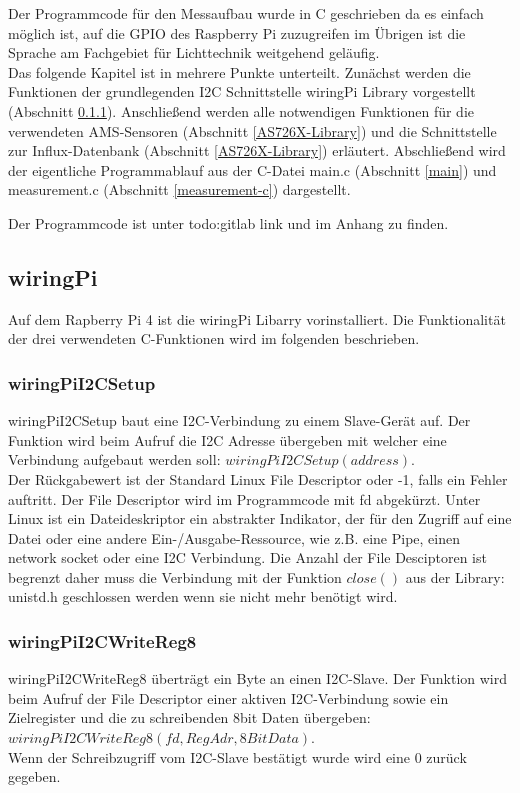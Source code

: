 Der Programmcode für den Messaufbau wurde in C geschrieben da es einfach möglich ist, auf die GPIO des Raspberry Pi zuzugreifen im Übrigen ist die Sprache am Fachgebiet für Lichttechnik weitgehend geläufig.\\
Das folgende Kapitel ist in mehrere Punkte unterteilt. Zunächst werden die Funktionen der grundlegenden I2C Schnittstelle wiringPi Library vorgestellt (Abschnitt \ref{wiringPiI2CSetup}). Anschließend werden alle notwendigen Funktionen für die verwendeten AMS-Sensoren (Abschnitt \ref{AS726X-Library}) und die Schnittstelle zur Influx-Datenbank (Abschnitt \ref{AS726X-Library}) erläutert.
Abschließend wird der eigentliche Programmablauf aus der C-Datei main.c (Abschnitt \ref{main}) und measurement.c (Abschnitt \ref{measurement-c}) dargestellt.

\noindent Der Programmcode ist unter todo:gitlab link und im Anhang zu finden.

\subsection{wiringPi}
Auf dem Rapberry Pi 4 ist die  wiringPi Libarry vorinstalliert. 
Die Funktionalität der drei verwendeten C-Funktionen wird im folgenden beschrieben.

\subsubsection{wiringPiI2CSetup}\label{wiringPiI2CSetup}
wiringPiI2CSetup baut eine I2C-Verbindung zu einem Slave-Gerät auf.
Der Funktion wird beim Aufruf die I2C Adresse übergeben mit welcher eine Verbindung aufgebaut werden soll: $wiringPiI2CSetup(address)$.\\
Der Rückgabewert ist der Standard Linux File Descriptor oder -1, falls ein Fehler auftritt. 
Der File Descriptor wird im Programmcode mit fd abgekürzt.
Unter Linux ist ein Dateideskriptor ein abstrakter Indikator, der für den Zugriff auf eine Datei oder eine andere Ein-/Ausgabe-Ressource, wie z.B. eine Pipe,  einen network socket oder eine I2C Verbindung.
Die Anzahl der File Desciptoren ist begrenzt daher muss die Verbindung mit der Funktion $close()$ aus der Library: unistd.h geschlossen werden wenn sie nicht mehr benötigt wird.

\subsubsection{wiringPiI2CWriteReg8}
wiringPiI2CWriteReg8 überträgt ein Byte an einen I2C-Slave.
Der Funktion wird beim Aufruf der File Descriptor einer aktiven I2C-Verbindung sowie ein Zielregister und die zu schreibenden 8bit Daten übergeben:\\ $wiringPiI2CWriteReg8 (fd, RegAdr, 8BitData)$.\\
Wenn der Schreibzugriff vom I2C-Slave bestätigt wurde wird eine 0 zurück gegeben.

